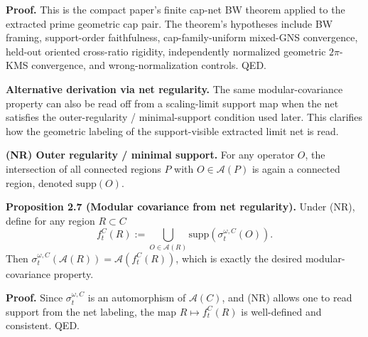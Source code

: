 \textbf{Proof.} This is the compact paper's finite cap-net BW theorem applied to the extracted
prime geometric cap pair. The theorem's hypotheses include BW framing, support-order faithfulness,
cap-family-uniform mixed-GNS convergence, held-out oriented cross-ratio rigidity, independently
normalized geometric \(2\pi\)-KMS convergence, and wrong-normalization controls. QED.

\textbf{Alternative derivation via net regularity.} The same modular-covariance property can also be read off from a scaling-limit support map when the net satisfies the outer-regularity / minimal-support condition used later. This clarifies how the geometric labeling of the support-visible extracted limit net is read.

\textbf{(NR) Outer regularity / minimal support.} For any operator \(O\), the intersection of all connected regions \(P\) with \(O\in\mathcal A(P)\) is again a connected region, denoted \(\mathrm{supp}(O)\).

\textbf{Proposition 2.7 (Modular covariance from net regularity).} Under (NR), define for any region \(R\subset C\)
\[
f_t^C(R)
:=
\bigcup_{O\in \mathcal A(R)}
\mathrm{supp}\!\left(\sigma_t^{\omega,C}(O)\right).
\]
Then \(\sigma_t^{\omega,C}(\mathcal A(R))=\mathcal A(f_t^C(R))\), which is exactly the desired modular-covariance property.

\textbf{Proof.} Since \(\sigma_t^{\omega,C}\) is an automorphism of \(\mathcal A(C)\), and (NR) allows one to read support from the net labeling, the map \(R\mapsto f_t^C(R)\) is well-defined and consistent. QED.

